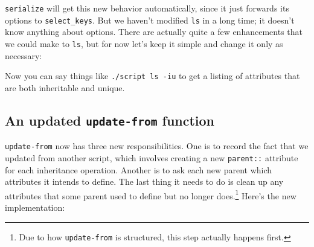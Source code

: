 \documentclass{report}
\begin{document}
      {\tt serialize} will get this new behavior automatically, since it just forwards its options to \verb|select_keys|. But we haven't modified {\tt ls} in a long time; it doesn't know
      anything about options. There are actually quite a few enhancements that we could make to {\tt ls}, but for now let's keep it simple and change it only as necessary:


      Now you can say things like {\tt ./script ls -iu} to get a listing of attributes that are both inheritable and unique.

\subsection{An updated {\tt update-from} function}\label{sec:cloning-and-inheritance-an-updated-update-from-function}
      {\tt update-from} now has three new responsibilities. One is to record the fact that we updated from another script, which involves creating a new {\tt parent::} attribute for each
      inheritance operation. Another is to ask each new parent which attributes it intends to define. The last thing it needs to do is clean up any attributes that some parent used to define
      but no longer does.\footnote{Due to how {\tt update-from} is structured, this step actually happens first.} Here's the new implementation:
\end{document}
